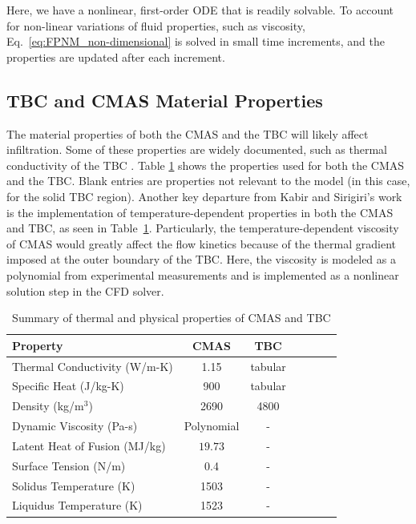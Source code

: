 \documentclass[%
 aip,
 amsmath,amssymb,
 reprint,%
]{revtex4-1}
\begin{document}


\noindent Here, we have a nonlinear, first-order ODE that is readily solvable. To account for non-linear variations of fluid properties, such as viscosity, Eq.~\ref{eq:FPNM_non-dimensional} is solved in small time increments, and the properties are updated after each increment.

\subsection{TBC and CMAS Material Properties}
\label{subsec:CMAS/TBCProp}
The material properties of both the CMAS and the TBC will likely affect infiltration. Some of these properties are widely documented, such as thermal conductivity of the TBC \cite{Han2023}. Table \ref{tab:CMAS and TBC properties} shows the properties used for both the CMAS and the TBC. Blank entries are properties not relevant to the model (in this case, for the solid TBC region).
Another key departure from Kabir and Sirigiri's work \cite{Kabir, Sirigiri2018} is the implementation of temperature-dependent properties in both the CMAS and TBC, as seen in Table~\ref{tab:CMAS and TBC properties}. Particularly, the temperature-dependent viscosity of CMAS would greatly affect the flow kinetics because of the thermal gradient imposed at the outer boundary of the TBC. Here, the viscosity is modeled as a polynomial from experimental measurements \cite{Naraparaju2019} and is implemented as a nonlinear solution step in the CFD solver.


\begin{table}[htp!]
\caption{\label{tab:CMAS and TBC properties} Summary of thermal and physical properties of CMAS and TBC}
\centering
\begin{ruledtabular}
\begin{tabular}{lcccccc}
Property & CMAS& TBC\\\hline
Thermal Conductivity (W/m-K)& 1.15 \cite{Bakal2017} & tabular \cite{Han2023} \\
Specific Heat (J/kg-K)& 900 \cite{KAKUDA2015350} & tabular \cite{Han2023} \\
Density (kg/m$^3$)& 2690 \cite{BANSAL20153901}& 4800 \cite{KAKUDA20092583}\\
Dynamic Viscosity (Pa-s)& Polynomial \cite{Naraparaju2019}& -\\
Latent Heat of Fusion (MJ/kg)& $19.73$ \cite{Costa2019}& -\\
Surface Tension (N/m)& 0.4 \cite{Bravo2020}& -\\
Solidus Temperature (K) & 1503\cite{Naraparaju2014} &-\\
Liquidus Temperature (K) & 1523\cite{Naraparaju2014} &-\\
\end{tabular}
\end{ruledtabular}
\end{table}
\end{document}
